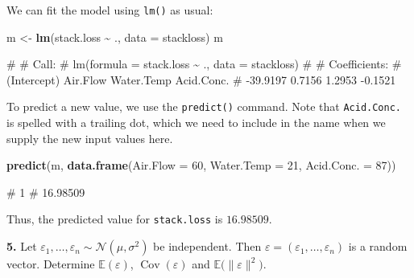 \documentclass[
  a4paper,
]{article}
\newenvironment{Shaded}{\begin{snugshade}}{\end{snugshade}}
\newcommand{\AttributeTok}[1]{\textcolor[rgb]{0.13,0.29,0.53}{#1}}
\newcommand{\DecValTok}[1]{\textcolor[rgb]{0.00,0.00,0.81}{#1}}
\newcommand{\FunctionTok}[1]{\textcolor[rgb]{0.13,0.29,0.53}{\textbf{#1}}}
\newcommand{\NormalTok}[1]{#1}
\newcommand{\OtherTok}[1]{\textcolor[rgb]{0.56,0.35,0.01}{#1}}
\newcommand{\SpecialCharTok}[1]{\textcolor[rgb]{0.81,0.36,0.00}{\textbf{#1}}}
\theoremstyle{definition}
\theoremstyle{definition}
\theoremstyle{definition}
\theoremstyle{definition}
\theoremstyle{remark}
\begin{document}
\begin{myanswers}
We can fit the model using \texttt{lm()} as usual:

\begin{Shaded}
\begin{Highlighting}[]
\NormalTok{m }\OtherTok{\textless{}{-}} \FunctionTok{lm}\NormalTok{(stack.loss }\SpecialCharTok{\textasciitilde{}}\NormalTok{ ., }\AttributeTok{data =}\NormalTok{ stackloss)}
\NormalTok{m}
\end{Highlighting}
\end{Shaded}

\begin{Shaded}
\begin{Highlighting}[]
\NormalTok{\# }
\NormalTok{\# Call:}
\NormalTok{\# lm(formula = stack.loss \textasciitilde{} ., data = stackloss)}
\NormalTok{\# }
\NormalTok{\# Coefficients:}
\NormalTok{\# (Intercept)     Air.Flow   Water.Temp   Acid.Conc.  }
\NormalTok{\#    {-}39.9197       0.7156       1.2953      {-}0.1521}
\end{Highlighting}
\end{Shaded}

To predict a new value, we use the \texttt{predict()} command. Note that
\texttt{Acid.Conc.} is spelled with a trailing dot, which we need to include
in the name when we supply the new input values here.

\begin{Shaded}
\begin{Highlighting}[]
\FunctionTok{predict}\NormalTok{(m, }\FunctionTok{data.frame}\NormalTok{(}\AttributeTok{Air.Flow =} \DecValTok{60}\NormalTok{, }\AttributeTok{Water.Temp =} \DecValTok{21}\NormalTok{, }\AttributeTok{Acid.Conc. =} \DecValTok{87}\NormalTok{))}
\end{Highlighting}
\end{Shaded}

\begin{Shaded}
\begin{Highlighting}[]
\NormalTok{\#        1 }
\NormalTok{\# 16.98509}
\end{Highlighting}
\end{Shaded}

Thus, the predicted value for \texttt{stack.loss} is \(16.98509\).

\end{myanswers}

\textbf{5.} Let \(\varepsilon_1, \ldots, \varepsilon_n \sim \mathcal{N}(\mu, \sigma^2)\) be independent.
Then \(\varepsilon= (\varepsilon_1, \ldots, \varepsilon_n)\) is a random vector. Determine
\(\mathbb{E}(\varepsilon)\), \(\mathop{\mathrm{Cov}}(\varepsilon)\) and \(\mathbb{E}\bigl( \|\varepsilon\|^2 \bigr)\).
\end{document}
